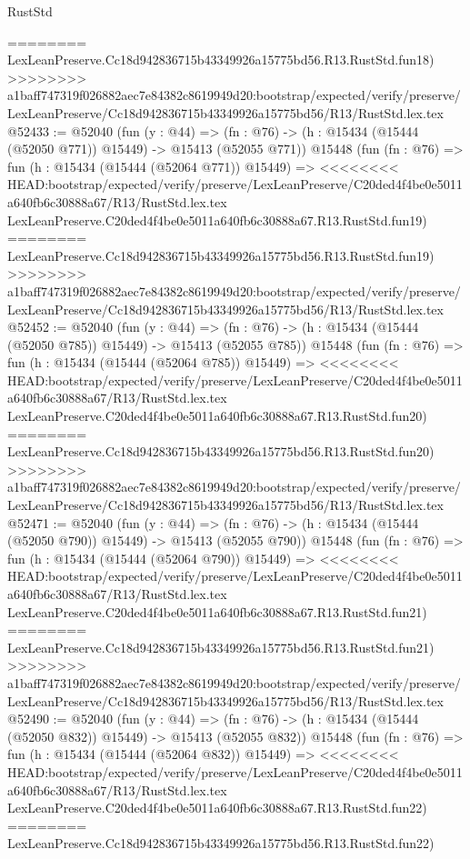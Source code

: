 \begin{lexlean}{RustStd}
\begin{coremodule}
{\begin{coremodule}
{{{{{{{{{{{{{{{{{{{{{{{{{{{{{{{{{{{{{{{{{{{{{{{{{{{{{{{{{{{{========
    LexLeanPreserve.Cc18d942836715b43349926a15775bd56.R13.RustStd.fun18)
>>>>>>>> a1baff747319f026882aec7e84382c8619949d20:bootstrap/expected/verify/preserve/LexLeanPreserve/Cc18d942836715b43349926a15775bd56/R13/RustStd.lex.tex
@52433 := @52040
    (fun (y : @44) =>
    (fn : @76) -> (h : @15434 (@15444 (@52050 @771)) @15449) -> @15413 (@52055 @771))
    @15448
    (fun (fn : @76) =>
    fun (h : @15434 (@15444 (@52064 @771)) @15449) =>
<<<<<<<< HEAD:bootstrap/expected/verify/preserve/LexLeanPreserve/C20ded4f4be0e5011a640fb6c30888a67/R13/RustStd.lex.tex
    LexLeanPreserve.C20ded4f4be0e5011a640fb6c30888a67.R13.RustStd.fun19)
========
    LexLeanPreserve.Cc18d942836715b43349926a15775bd56.R13.RustStd.fun19)
>>>>>>>> a1baff747319f026882aec7e84382c8619949d20:bootstrap/expected/verify/preserve/LexLeanPreserve/Cc18d942836715b43349926a15775bd56/R13/RustStd.lex.tex
@52452 := @52040
    (fun (y : @44) =>
    (fn : @76) -> (h : @15434 (@15444 (@52050 @785)) @15449) -> @15413 (@52055 @785))
    @15448
    (fun (fn : @76) =>
    fun (h : @15434 (@15444 (@52064 @785)) @15449) =>
<<<<<<<< HEAD:bootstrap/expected/verify/preserve/LexLeanPreserve/C20ded4f4be0e5011a640fb6c30888a67/R13/RustStd.lex.tex
    LexLeanPreserve.C20ded4f4be0e5011a640fb6c30888a67.R13.RustStd.fun20)
========
    LexLeanPreserve.Cc18d942836715b43349926a15775bd56.R13.RustStd.fun20)
>>>>>>>> a1baff747319f026882aec7e84382c8619949d20:bootstrap/expected/verify/preserve/LexLeanPreserve/Cc18d942836715b43349926a15775bd56/R13/RustStd.lex.tex
@52471 := @52040
    (fun (y : @44) =>
    (fn : @76) -> (h : @15434 (@15444 (@52050 @790)) @15449) -> @15413 (@52055 @790))
    @15448
    (fun (fn : @76) =>
    fun (h : @15434 (@15444 (@52064 @790)) @15449) =>
<<<<<<<< HEAD:bootstrap/expected/verify/preserve/LexLeanPreserve/C20ded4f4be0e5011a640fb6c30888a67/R13/RustStd.lex.tex
    LexLeanPreserve.C20ded4f4be0e5011a640fb6c30888a67.R13.RustStd.fun21)
========
    LexLeanPreserve.Cc18d942836715b43349926a15775bd56.R13.RustStd.fun21)
>>>>>>>> a1baff747319f026882aec7e84382c8619949d20:bootstrap/expected/verify/preserve/LexLeanPreserve/Cc18d942836715b43349926a15775bd56/R13/RustStd.lex.tex
@52490 := @52040
    (fun (y : @44) =>
    (fn : @76) -> (h : @15434 (@15444 (@52050 @832)) @15449) -> @15413 (@52055 @832))
    @15448
    (fun (fn : @76) =>
    fun (h : @15434 (@15444 (@52064 @832)) @15449) =>
<<<<<<<< HEAD:bootstrap/expected/verify/preserve/LexLeanPreserve/C20ded4f4be0e5011a640fb6c30888a67/R13/RustStd.lex.tex
    LexLeanPreserve.C20ded4f4be0e5011a640fb6c30888a67.R13.RustStd.fun22)
========
    LexLeanPreserve.Cc18d942836715b43349926a15775bd56.R13.RustStd.fun22)
}}}}}}}}}}}}}}}}}}}}}}}}}}}}}}}}}}}}}}}}}}}}}}}}}}}}}}}}}}}}
\end{coremodule}}
\end{coremodule}
\end{lexlean}
